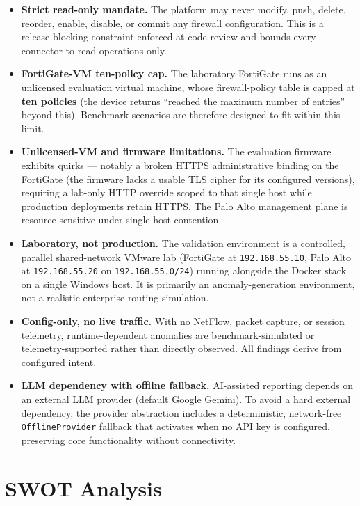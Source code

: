 \documentclass[12pt,a4paper]{report}
\renewcommand{\_}{\textunderscore\allowbreak}
\begin{document}
\begin{itemize}[leftmargin=1.4em]
  \item \textbf{Strict read-only mandate.} The platform may never modify, push, delete, reorder, enable, disable, or commit any firewall configuration. This is a release-blocking constraint enforced at code review and bounds every connector to read operations only.
  \item \textbf{FortiGate-VM ten-policy cap.} The laboratory FortiGate runs as an unlicensed evaluation virtual machine, whose firewall-policy table is capped at \textbf{ten policies} (the device returns ``reached the maximum number of entries'' beyond this). Benchmark scenarios are therefore designed to fit within this limit.
  \item \textbf{Unlicensed-VM and firmware limitations.} The evaluation firmware exhibits quirks --- notably a broken HTTPS administrative binding on the FortiGate (the firmware lacks a usable TLS cipher for its configured versions), requiring a lab-only HTTP override scoped to that single host while production deployments retain HTTPS. The Palo Alto management plane is resource-sensitive under single-host contention.
  \item \textbf{Laboratory, not production.} The validation environment is a controlled, parallel shared-network VMware lab (FortiGate at \texttt{192.168.55.10}, Palo Alto at \texttt{192.168.55.20} on \texttt{192.168.55.0/24}) running alongside the Docker stack on a single Windows host. It is primarily an anomaly-generation environment, not a realistic enterprise routing simulation.
  \item \textbf{Config-only, no live traffic.} With no NetFlow, packet capture, or session telemetry, runtime-dependent anomalies are benchmark-simulated or telemetry-supported rather than directly observed. All findings derive from configured intent.
  \item \textbf{LLM dependency with offline fallback.} AI-assisted reporting depends on an external LLM provider (default Google Gemini). To avoid a hard external dependency, the provider abstraction includes a deterministic, network-free \texttt{OfflineProvider} fallback that activates when no API key is configured, preserving core functionality without connectivity.
\end{itemize}

\section{SWOT Analysis}
\label{sec:ch1-swot}
\end{document}

